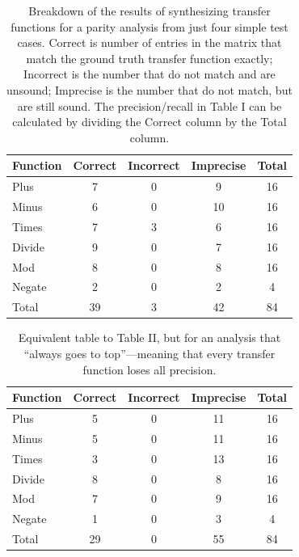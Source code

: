 \documentclass[10pt,conference]{IEEEtran}
\begin{document}
\begin{table}
\centering
 \begin{tabular}{l c c c c }
  
  Function & Correct & Incorrect & Imprecise & Total\\ 
  \midrule
  Plus & 7 & 0 & 9 & 16 \\
  Minus & 6 & 0 & 10 & 16 \\
  Times & 7 & 3 & 6 & 16 \\
  Divide & 9 & 0 & 7 & 16 \\
  Mod & 8 & 0 & 8 & 16 \\
  Negate & 2 & 0 & 2 & 4 \\
  \midrule
  Total & 39 & 3 & 42 & 84 \\
 \end{tabular}
 \caption{Breakdown of the results of synthesizing transfer functions
 for a parity analysis from just four simple test cases. Correct is number
 of entries in the matrix that match the ground truth transfer function
 exactly; Incorrect is the number that do not match and are unsound;
 Imprecise is the number that do not match, but are still sound. The
 precision/recall in Table I can be calculated by dividing
 the Correct column by the Total column.}
 \label{tab-parity0}
\end{table}

\begin{table}
\centering
 \begin{tabular}{l c c c c }
  
  Function & Correct & Incorrect & Imprecise & Total\\ 
  \midrule
  Plus & 5 & 0 & 11 & 16 \\
  Minus & 5 & 0 & 11 & 16 \\
  Times & 3 & 0 & 13 & 16 \\
  Divide & 8 & 0 & 8 & 16 \\
  Mod & 7 & 0 & 9 & 16 \\
  Negate & 1 & 0 & 3 & 4 \\
  \midrule
  Total & 29 & 0 & 55 & 84 \\
 \end{tabular}
 \caption{Equivalent table to Table II, but for an
 analysis that ``always goes to top''---meaning that every
 transfer function loses all precision.}
 \label{tab-top}
\end{table}
\end{document}
